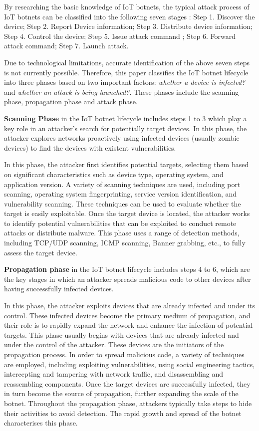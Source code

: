 \documentclass[journal]{IEEEtai}
\begin{document}
By researching the basic knowledge of IoT botnets, the typical attack process of IoT botnets can be classified into the following seven stages \cite{272224}: 
Step 1. Discover the device;
Step 2. Report Device information;
Step 3. Distribute device information;
Step 4. Control the device;
Step 5. Issue attack command ;
Step 6. Forward attack command;
Step 7. Launch attack.


Due to technological limitations, accurate identification of the above seven steps is not currently possible.
Therefore, this paper classifies the IoT botnet lifecycle into three phases based on two important factors: \textit {whether a device is infected?} and \textit {whether an attack is being launched?}.
These phases include the scanning phase, propagation phase and attack phase.

\textbf {Scanning Phase} in the IoT botnet lifecycle includes steps 1 to 3 which play a key role in an attacker's search for potentially target devices.
In this phase, the attacker explores networks proactively using infected devices (usually zombie devices) to find the devices with existent vulnerabilities.

In this phase, the attacker first identifies potential targets, selecting them based on significant characteristics such as device type, operating system, and application version.
A variety of scanning techniques are used, including port scanning, operating system fingerprinting, service version identification, and vulnerability scanning.
These techniques can be used to evaluate whether the target is easily exploitable.
Once the target device is located, the attacker works to identify potential vulnerabilities that can be exploited to conduct remote attacks or distribute malware.
This phase uses a range of detection methods, including TCP/UDP scanning, ICMP scanning, Banner grabbing, etc., to fully assess the target device.


\textbf{Propagation phase} in the IoT botnet lifecycle includes steps 4 to 6, which are the key stages in which an attacker spreads malicious code to other devices after having successfully infected devices.

In this phase, the attacker exploits devices that are already infected and under its control.
These infected devices become the primary medium of propagation, and their role is to rapidly expand the network and enhance the infection of potential targets.
This phase usually begins with devices that are already infected and under the control of the attacker.
These devices are the initiators of the propagation process.
In order to spread malicious code, a variety of techniques are employed, including exploiting vulnerabilities, using social engineering tactics, intercepting and tampering with network traffic, and disassembling and reassembling components.
Once the target devices are successfully infected, they in turn become the source of propagation, further expanding the scale of the botnet.
Throughout the propagation phase, attackers typically take steps to hide their activities to avoid detection.
The rapid growth and spread of the botnet characterises this phase.
\end{document}
